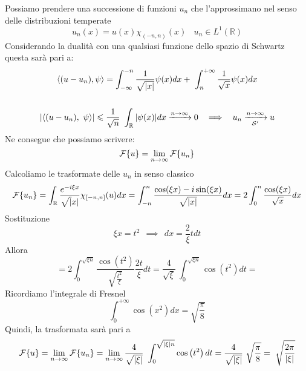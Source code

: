 Possiamo prendere una successione di funzioni $u_{n}$ che l'approssimano nel senso delle distribuzioni temperate
\begin{equation*}
u_{n}( x) =u( x) \chi _{( -n,n)}( x) \ \ \ \ u_{n} \in L^{1} (\mathbb{R} )
\end{equation*}
Considerando la dualità con una qualsiasi funzione dello spazio di Schwartz questa sarà pari a:
\begin{gather*}
\langle ( u-u_{n}) ,\psi \rangle =\int ^{-n}_{-\infty }\frac{1}{\sqrt{| x| }} \psi ( x) dx+\ \int ^{+\infty }_{n}\frac{1}{\sqrt{x}} \psi ( x) dx\\
\\
| \langle ( u-u_{n}) ,\ \psi \rangle | \leqslant \frac{1}{\sqrt{n}} \ \int _{\mathbb{R}}| \psi ( x)| dx\xrightarrow{n\rightarrow \infty } 0\ \ \implies \ \ u_{n}\xrightarrow[\Sc  ']{n\rightarrow \infty } u
\end{gather*}
Ne consegue che possiamo scrivere:
\begin{equation*}
\mathcal{F} \{u\} =\lim _{n\rightarrow \infty }\mathcal{F} \{u_{n}\}
\end{equation*}
Calcoliamo le trasformate delle $u_{n}$ in senso classico
\begin{equation*}
\mathcal{F} \{u_{n}\} =\int _{\mathbb{R}}\frac{e^{-i\xi x}}{\sqrt{|} x|} \chi _{[-n,n]} (u)dx=\int ^{n}_{-n}\frac{\cos( \xi x) -i\sin (\xi x)}{\sqrt{| x| }} dx=2\int ^{n}_{0}\frac{\cos( \xi x)}{\sqrt{x}} dx
\end{equation*}
Sostituzione
\begin{equation*}
\xi x=t^{2} \ \ \implies \ \ dx=\frac{2}{\xi } tdt
\end{equation*}
Allora
\begin{equation*}
=2\int ^{\sqrt{\xi n}}_{0}\frac{\cos\left( t^{2}\right)}{\sqrt{\frac{t^{2}}{\xi }}}\frac{2t}{\xi } dt=\frac{4}{\sqrt{\xi }} \ \int ^{\sqrt{\xi n}}_{0}\cos\left( t^{2}\right) dt=
\end{equation*}
Ricordiamo l'integrale di Fresnel
\begin{equation*}
\int ^{+\infty }_{0}\cos\left( x^{2}\right) dx=\sqrt{\frac{\pi }{8}}
\end{equation*}
Quindi, la trasformata sarà pari a
\begin{equation*}
\Fc \{u\} =\lim _{n\rightarrow \infty }\Fc \{u_{n}\} =\lim _{n\rightarrow \infty }\frac{4}{\sqrt{| \xi | }} \ \int ^{\sqrt{| \xi | n}}_{0}\cos\left( t^{2}\right) dt=\frac{4}{\sqrt{| \xi | }} \ \sqrt{\frac{\pi }{8}} =\ \sqrt{\frac{2\pi }{| \xi | }}
\end{equation*}
